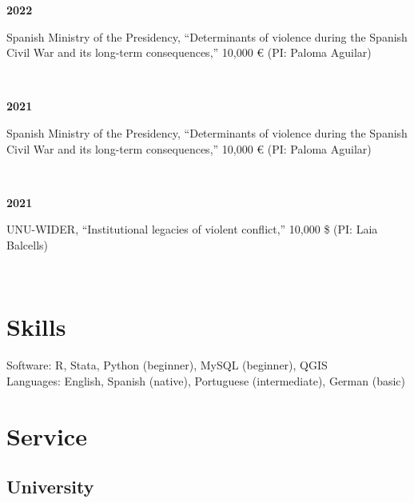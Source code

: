 \documentclass[a4paper, 12pt]{article}
\begin{document}
\begin{minipage}[t]{0.1\textwidth}
\textbf{2022}
\end{minipage}\hfill\begin{minipage}[t]{0.9\textwidth}
Spanish Ministry of the Presidency, ``Determinants of violence during the Spanish Civil War and its long-term consequences,'' 10,000 € (PI: Paloma Aguilar)\\\vspace{-8pt}
\end{minipage}\\
\begin{minipage}[t]{0.1\textwidth}
\textbf{2021}
\end{minipage}\hfill\begin{minipage}[t]{0.9\textwidth}
Spanish Ministry of the Presidency, ``Determinants of violence during the Spanish Civil War and its long-term consequences,'' 10,000 € (PI: Paloma Aguilar)\\\vspace{-8pt}
\end{minipage}\\
\begin{minipage}[t]{0.1\textwidth}
\textbf{2021}
\end{minipage}\hfill\begin{minipage}[t]{0.9\textwidth}
UNU-WIDER, ``Institutional legacies of violent conflict,'' 10,000 \$ (PI: Laia Balcells)
\end{minipage}\\


\vspace{-10pt}
\section*{Skills}

Software: R, Stata, Python (beginner), MySQL (beginner), QGIS\\
Languages: English, Spanish (native), Portuguese (intermediate), German (basic)

\vspace{-10pt}
\section*{Service}

\subsection*{University}
\end{document}
